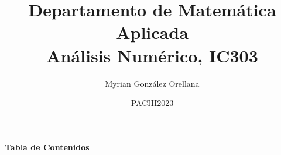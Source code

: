 \documentclass[10pt,legalpaper]{beamer}
\author{Myrian González Orellana}
\title{Departamento de Matemática Aplicada\\
Análisis Numérico, IC303}
\date{PACIII2023}
\begin{document}
\begin{frame}
\titlepage
\end{frame}
\begin{frame}{\centering\textbf{Tabla de Contenidos}}
\tableofcontents[hideallsubsections]
\end{frame}

%
%
%
%
\end{document}
